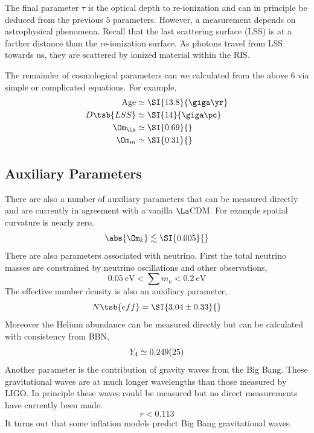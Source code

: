 \documentclass{article}
\begin{document}
The final parameter $\tau$ is the optical depth to re-ionization and can in principle be deduced from the previous $5$ parameters. However, a measurement depends on astrophysical phenomena. Recall that the last scattering surface (LSS) is at a farther distance than the re-ionization surface. As photons travel from LSS towards us, they are scattered by ionized material within the RIS.

\begin{center}
\end{center}

The remainder of cosmological parameters can we calculated from the above $6$ via simple or complicated equations. For example,
\begin{align*}
    \text{Age} &\simeq \SI{13.8}{\giga\yr} \\
    D\tsb{LSS} &\simeq \SI{14}{\giga\pc} \\
    \Om_{\La} &\simeq \SI{0.69}{} \\
    \Om_{m} &\simeq \SI{0.31}{}
\end{align*}

\subsection{Auxiliary Parameters}
There are also a number of auxiliary parameters that can be measured directly and are currently in agreement with a vanilla $\La$CDM. For example spatial curvature is nearly zero.
\[ \abs{\Om_{k}} \lesssim \SI{0.005}{} \]
There are also parameters associated with neutrino. First the total neutrino masses are constrained by neutrino oscillations and other observations,
\[ \SI{0.05}{\eV} < \sum {m_{\nu}} < \SI{0.2}{\eV} \]
The effective number density is also an auxiliary parameter,
\[ N\tsb{eff} = \SI{3.04\pm0.33}{} \]
Moreover the Helium abundance can be measured directly but can be calculated with consistency from BBN,
\[ Y_4 \simeq \SI{0.249\pm0.025}{} \]
Another parameter is the contribution of gravity waves from the Big Bang. These gravitational waves are at much longer wavelengths than those measured by LIGO. In principle these waves could be measured but no direct measurements have currently been made.
\[ r < 0.113 \]
It turns out that some inflation models predict Big Bang gravitational waves.\\
\end{document}
